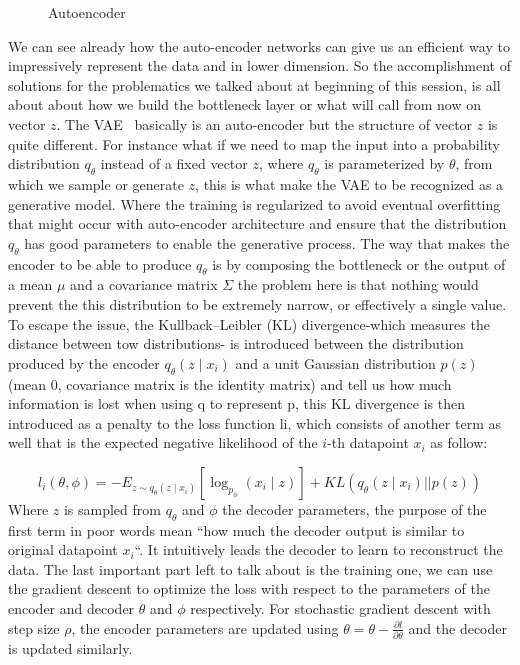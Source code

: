 \begin{figure}
	\centerline
	\autoencoder
	\caption{Autoencoder}
	\label{fig:autoencoder}
\end{figure} 

We can see already how the auto-encoder networks can give us an efficient way to  impressively represent the data and in lower dimension. So the accomplishment of solutions for the problematics we talked about at beginning of this session, is all about about how we build the bottleneck layer or what will call from now on vector $z$. The VAE~\cite{kingma2013auto} basically is an auto-encoder but the structure of vector $z$ is quite different. For instance what if we need to map the input into a probability distribution $q_{\theta}$ instead of a fixed vector $z$, where $q_{\theta}$ is parameterized by $\theta$, from which we sample or generate $z$, this is what make the VAE to be recognized as a generative model. Where the training is regularized to avoid eventual overfitting  that might occur with auto-encoder architecture and ensure that the distribution $q_{\theta}$ has good parameters to enable the generative process. The way that makes the encoder to be able to produce $q_\theta$ is by composing the bottleneck or the output of a mean $\mu$ and a covariance matrix $\Sigma$ the problem here is that nothing would prevent the this distribution to be extremely narrow, or effectively a single value. To escape the issue, the Kullback–Leibler (KL) divergence-which measures the distance between tow distributions- is introduced  between the distribution produced by the encoder $q_{\theta}(z \mid x_i)$ and a unit Gaussian distribution $p(z)$(mean $0$, covariance matrix is the identity matrix) and tell us how much information is lost when using q to represent p, this KL divergence is then introduced as a penalty to the loss function li, which consists of another term as well that is the expected negative likelihood of the $i$-th datapoint $x_i$ as follow:


\begin{equation}
l_i(\theta,\phi)=-E_{z\sim q_\theta (z\mid x_i)}[\log_{p_\phi}(x_i \mid z)]+KL(q_\theta (z\mid x_i)||p(z))
\label{eq:VAE_loss}
\end{equation}
Where $z$ is sampled from $q_\theta$ and $\phi$ the decoder parameters, the purpose of the first term in poor words mean “how much the decoder output is similar to original datapoint $x_i$“. It intuitively leads the decoder to learn to reconstruct the data. The last important part left to talk about is the training one, we can use the gradient descent to optimize the loss with respect to the parameters of the encoder and decoder $\theta$ and $\phi$ respectively. For stochastic gradient descent with step size $\rho$, the encoder parameters are updated using $\theta=\theta-\frac{\partial l}{\partial \theta} $  and the decoder is updated similarly.



